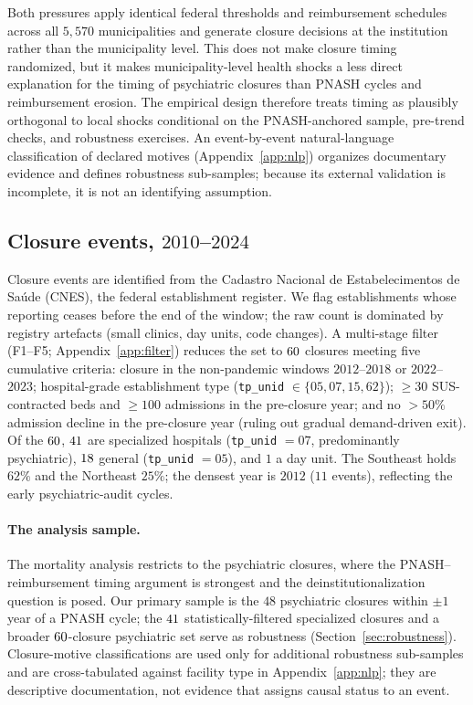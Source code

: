 Both pressures apply identical federal thresholds and reimbursement
schedules across all $5{,}570$ municipalities and generate closure
decisions at the institution rather than the municipality level. This
does not make closure timing randomized, but it makes municipality-level
health shocks a less direct explanation for the timing of psychiatric
closures than PNASH cycles and reimbursement erosion. The empirical
design therefore treats timing as plausibly orthogonal to local shocks
conditional on the PNASH-anchored sample, pre-trend checks, and
robustness exercises. An event-by-event natural-language classification
of declared motives (Appendix~\ref{app:nlp}) organizes documentary
evidence and defines robustness sub-samples; because its external
validation is incomplete, it is not an identifying assumption.

\subsection{\texorpdfstring{Closure events, $2010$--$2024$}{Closure events, 2010--2024}}
\label{sec:setting-closures}

Closure events are identified from the Cadastro Nacional de
Estabelecimentos de Saúde (CNES), the federal establishment register. We
flag establishments whose reporting ceases before the end of the window;
the raw count is dominated by registry artefacts (small clinics, day
units, code changes). A multi-stage filter
(F1--F5; Appendix~\ref{app:filter}) reduces the set to $60$ closures
meeting five cumulative criteria: closure in the non-pandemic windows
$2012$--$2018$ or $2022$--$2023$; hospital-grade establishment type
(\texttt{tp\_unid} $\in \{05, 07, 15, 62\}$); $\geq 30$ SUS-contracted
beds and $\geq 100$ admissions in the pre-closure year; and no $> 50\%$
admission decline in the pre-closure year (ruling out gradual
demand-driven exit). Of the $60$, $41$ are specialized hospitals
(\texttt{tp\_unid} $= 07$, predominantly psychiatric), $18$ general
(\texttt{tp\_unid} $= 05$), and $1$ a day unit. The Southeast holds
$62\%$ and the Northeast $25\%$; the densest year is $2012$ ($11$
events), reflecting the early psychiatric-audit cycles.

\paragraph{The analysis sample.} The mortality analysis restricts to the
psychiatric closures, where the PNASH--reimbursement timing argument
is strongest and the deinstitutionalization question is posed. Our
primary sample is the $48$ psychiatric closures within $\pm 1$ year of a
PNASH cycle; the $41$ statistically-filtered specialized closures and a
broader $60$-closure psychiatric set serve as robustness
(Section~\ref{sec:robustness}). Closure-motive classifications are used
only for additional robustness sub-samples and are cross-tabulated
against facility type in Appendix~\ref{app:nlp}; they are descriptive
documentation, not evidence that assigns causal status to an event.
